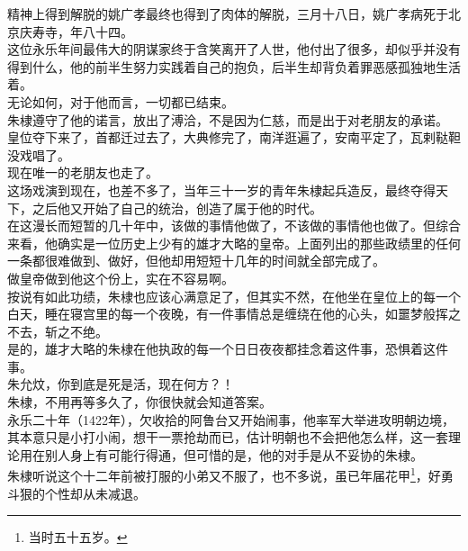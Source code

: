 \begin{multicols}{\theparacolNo}
精神上得到解脱的姚广孝最终也得到了肉体的解脱，三月十八日，姚广孝病死于北京庆寿寺，年八十四。\\

这位永乐年间最伟大的阴谋家终于含笑离开了人世，他付出了很多，却似乎并没有得到什么，他的前半生努力实践着自己的抱负，后半生却背负着罪恶感孤独地生活着。\\

无论如何，对于他而言，一切都已结束。\\

朱棣遵守了他的诺言，放出了溥洽，不是因为仁慈，而是出于对老朋友的承诺。\\

皇位夺下来了，首都迁过去了，大典修完了，南洋逛遍了，安南平定了，瓦剌鞑靼没戏唱了。\\

现在唯一的老朋友也走了。\\

这场戏演到现在，也差不多了，当年三十一岁的青年朱棣起兵造反，最终夺得天下，之后他又开始了自己的统治，创造了属于他的时代。\\

在这漫长而短暂的几十年中，该做的事情他做了，不该做的事情他也做了。但综合来看，他确实是一位历史上少有的雄才大略的皇帝。上面列出的那些政绩里的任何一条都很难做到、做好，但他却用短短十几年的时间就全部完成了。\\

做皇帝做到他这个份上，实在不容易啊。\\

按说有如此功绩，朱棣也应该心满意足了，但其实不然，在他坐在皇位上的每一个白天，睡在寝宫里的每一个夜晚，有一件事情总是缠绕在他的心头，如噩梦般挥之不去，斩之不绝。\\

是的，雄才大略的朱棣在他执政的每一个日日夜夜都挂念着这件事，恐惧着这件事。\\

朱允炆，你到底是死是活，现在何方？！\\

朱棣，不用再等多久了，你很快就会知道答案。\\

永乐二十年（1422年），欠收拾的阿鲁台又开始闹事，他率军大举进攻明朝边境，其本意只是小打小闹，想干一票抢劫而已，估计明朝也不会把他怎么样，这一套理论用在别人身上有可能行得通，但可惜的是，他的对手是从不妥协的朱棣。\\

朱棣听说这个十二年前被打服的小弟又不服了，也不多说，虽已年届花甲\footnote{当时五十五岁。}，好勇斗狠的个性却从未减退。\\


\end{multicols}
